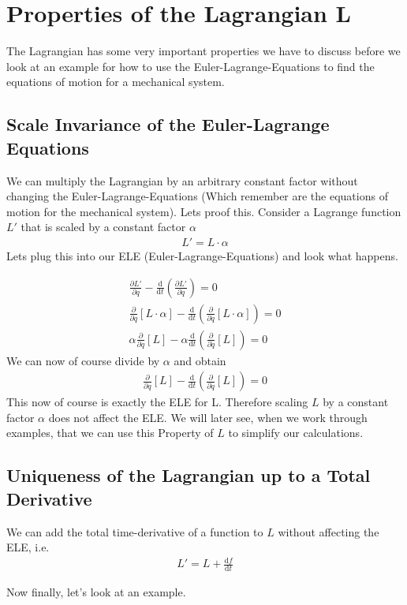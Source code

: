 \section{Properties of the Lagrangian L}
    The Lagrangian has some very important properties we have to discuss before we look at an example for how to use the Euler-Lagrange-Equations to find the equations of motion for a mechanical system. 
    
    \subsection*{Scale Invariance of the Euler-Lagrange Equations}
    We can multiply the Lagrangian by an arbitrary constant factor without changing the Euler-Lagrange-Equations (Which remember are the equations of motion for the mechanical system).
    Lets proof this. Consider a Lagrange function $L'$ that is scaled by a constant factor $\alpha$
    \begin{align}
    	L'=L\cdot\alpha
    \end{align}
    Lets plug this into our ELE (Euler-Lagrange-Equations) and look what happens.
    
    \begin{align}
        \frac{\partial L'}{\partial q}-\frac{\text{d}}{\text{d}t}\left(\frac{\partial L'}{\partial \dot{q}}\right) = 0\\
        \frac{\partial}{\partial q}\left[L\cdot\alpha\right]-\frac{\text{d}}{\text{d}t}\left(\frac{\partial}{\partial \dot{q}}\left[L\cdot\alpha\right]\right) = 0\\
        \alpha\frac{\partial}{\partial q}\left[L\right]-\alpha\frac{\text{d}}{\text{d}t}\left(\frac{\partial}{\partial \dot{q}}\left[L\right]\right) = 0
    \end{align}
    We can now of course divide by $\alpha$ and obtain
    \begin{align}\frac{\partial}{\partial q}\left[L\right]-\frac{\text{d}}{\text{d}t}\left(\frac{\partial}{\partial \dot{q}}\left[L\right]\right) = 0
    \end{align}
    This now of course is exactly the ELE for L. Therefore scaling $L$ by a constant factor $\alpha$ does not affect the ELE. 
    We will later see, when we work through examples, that we can use this Property of $L$ to simplify our calculations. 
    
    \subsection*{Uniqueness of the Lagrangian up to a Total Derivative}
    We can add the total time-derivative of a function to $L$ without affecting the ELE, i.e.
    \begin{align}
    	L' = L + \frac{\text{d} f}{\text{d}t}
    \end{align}
    
    Now finally, let's look at an example.

